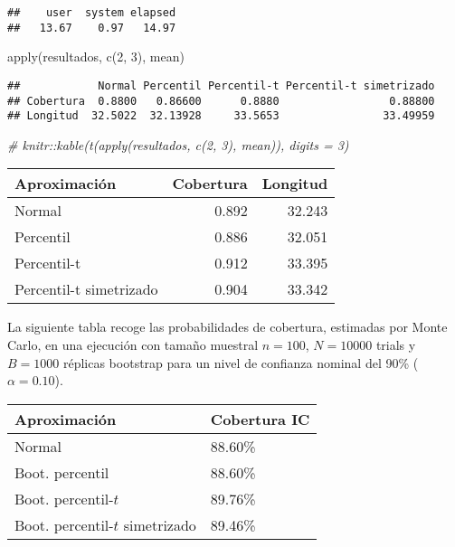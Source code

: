 \documentclass[
]{book}
\newenvironment{Shaded}{\begin{snugshade}}{\end{snugshade}}
\newcommand{\CommentTok}[1]{\textcolor[rgb]{0.56,0.35,0.01}{\textit{#1}}}
\newcommand{\DecValTok}[1]{\textcolor[rgb]{0.00,0.00,0.81}{#1}}
\newcommand{\FunctionTok}[1]{\textcolor[rgb]{0.00,0.00,0.00}{#1}}
\newcommand{\NormalTok}[1]{#1}
\theoremstyle{break}
\theoremstyle{definition}
\theoremstyle{definition}
\theoremstyle{definition}
\theoremstyle{definition}
\theoremstyle{remark}
\begin{document}
\begin{verbatim}
##    user  system elapsed 
##   13.67    0.97   14.97
\end{verbatim}

\begin{Shaded}
\begin{Highlighting}[]
\FunctionTok{apply}\NormalTok{(resultados, }\FunctionTok{c}\NormalTok{(}\DecValTok{2}\NormalTok{, }\DecValTok{3}\NormalTok{), mean)}
\end{Highlighting}
\end{Shaded}

\begin{verbatim}
##            Normal Percentil Percentil-t Percentil-t simetrizado
## Cobertura  0.8800   0.86600      0.8880                 0.88800
## Longitud  32.5022  32.13928     33.5653                33.49959
\end{verbatim}

\begin{Shaded}
\begin{Highlighting}[]
\CommentTok{\# knitr::kable(t(apply(resultados, c(2, 3), mean)), digits = 3)}
\end{Highlighting}
\end{Shaded}

\begin{longtable}[]{@{}lrr@{}}
\toprule
Aproximación & Cobertura & Longitud \\
\midrule
\endhead
Normal & 0.892 & 32.243 \\
Percentil & 0.886 & 32.051 \\
Percentil-t & 0.912 & 33.395 \\
Percentil-t simetrizado & 0.904 & 33.342 \\
\bottomrule
\end{longtable}

La siguiente tabla recoge las probabilidades de cobertura, estimadas por
Monte Carlo, en una ejecución con tamaño muestral \(n=100\), \(N=10000\)
trials y \(B=1000\) réplicas bootstrap para un nivel de confianza nominal
del 90\% (\(\alpha =0.10\)).

\begin{longtable}[]{@{}ll@{}}
\toprule
Aproximación & Cobertura IC \\
\midrule
\endhead
Normal & 88.60\% \\
Boot. percentil & 88.60\% \\
Boot. percentil-\(t\) & 89.76\% \\
Boot. percentil-\(t\) simetrizado & 89.46\% \\
\bottomrule
\end{longtable}
\end{document}
